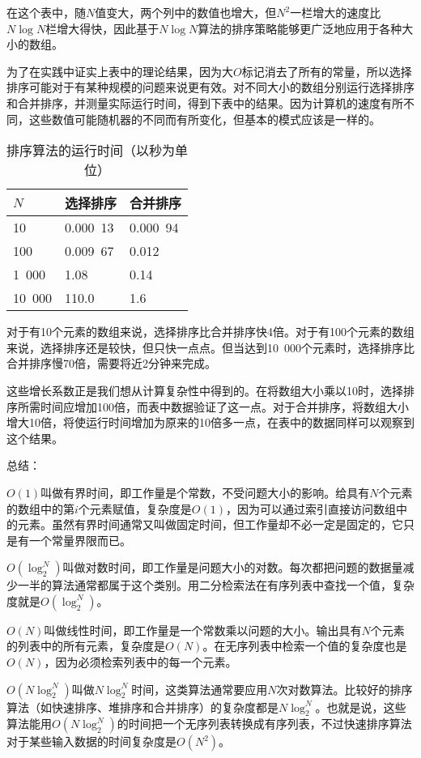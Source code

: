 在这个表中，随$N$值变大，两个列中的数值也增大，但$N^2$一栏增大的速度比$N\log N$栏增大得快，因此基于$N\log N$算法的排序策略能够更广泛地应用于各种大小的数组。

为了在实践中证实上表中的理论结果，因为大$O$标记消去了所有的常量，所以选择排序可能对于有某种规模的问题来说更有效。对不同大小的数组分别运行选择排序和合并排序，并测量实际运行时间，得到下表中的结果。因为计算机的速度有所不同，这些数值可能随机器的不同而有所变化，但基本的模式应该是一样的。
\begin{table}[!h]
\centering
\caption{排序算法的运行时间（以秒为单位）}
\begin{tabular}{|l|l|l|}
\hline
$N$			& 选择排序				& 合并排序			\\
\hline
10 				& 0.000~13				& 0.000~94			\\
\hline
100 			& 0.009~67				& 0.012				\\
\hline
1~000 		& 1.08					& 0.14				\\
\hline
10~000		& 110.0					& 1.6					\\
\hline
\end{tabular}
\end{table}

对于有10个元素的数组来说，选择排序比合并排序快4倍。对于有100个元素的数组来说，选择排序还是较快，但只快一点点。但当达到10~000个元素时，选择排序比合并排序慢70倍，需要将近2分钟来完成。

这些增长系数正是我们想从计算复杂性中得到的。在将数组大小乘以10时，选择排序所需时间应增加100倍，而表中数据验证了这一点。对于合并排序，将数组大小增大10倍，将使运行时间增加为原来的10倍多一点，在表中的数据同样可以观察到这个结果。

总结：

$O(1)$叫做有界时间，即工作量是个常数，不受问题大小的影响。给具有$N$个元素的数组中的第$i$个元素赋值，复杂度是$O(1)$，因为可以通过索引直接访问数组中的元素。虽然有界时间通常又叫做固定时间，但工作量却不必一定是固定的，它只是有一个常量界限而已。

$O(\log_2^N)$叫做对数时间，即工作量是问题大小的对数。每次都把问题的数据量减少一半的算法通常都属于这个类别。用二分检索法在有序列表中查找一个值，复杂度就是$O(\log_2^N)$。

$O(N)$叫做线性时间，即工作量是一个常数乘以问题的大小。输出具有$N$个元素的列表中的所有元素，复杂度是$O(N)$。在无序列表中检索一个值的复杂度也是$O(N)$，因为必须检索列表中的每一个元素。

$O(N\log_2^N)$叫做$N\log_2^N$时间，这类算法通常要应用$N$次对数算法。比较好的排序算法（如快速排序、堆排序和合并排序）的复杂度都是$N\log_2^N$。也就是说，这些算法能用$O(N\log_2^N)$的时间把一个无序列表转换成有序列表，不过快速排序算法对于某些输入数据的时间复杂度是$O(N^2)$。

